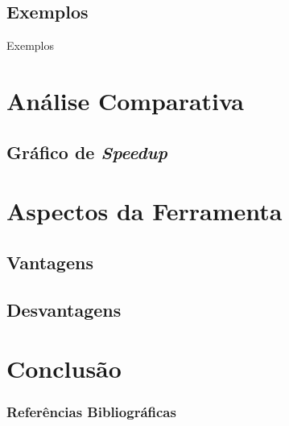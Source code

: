 \documentclass{beamer}
\begin{document}
\subsection{Exemplos}
\begin{frame}{Exemplos}
\end{frame}


\section{Análise Comparativa}
\subsection{Gráfico de \protect\textit{Speedup}}


\section{Aspectos da Ferramenta}
\subsection{Vantagens}
\subsection{Desvantagens}


\section{Conclusão}
\begin{frame}%
    \frametitle{Referências Bibliográficas}
    \tiny{}
    
\end{frame}
\end{document}
